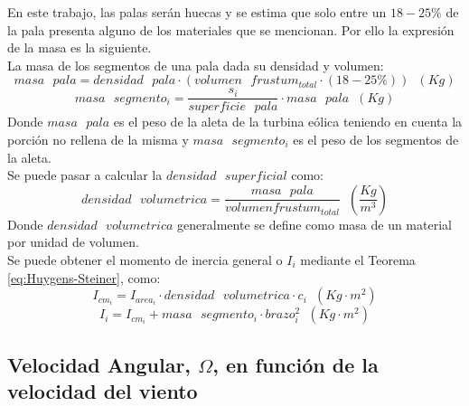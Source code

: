En este trabajo, las palas serán huecas y se estima que solo entre un $18-25\%$ de la pala presenta alguno de los materiales que se mencionan. Por ello la expresión de la masa es la siguiente. \\

La masa de los segmentos de una pala dada su densidad y volumen:
 \begin{equation}
 masa \text{ } pala = densidad \text{ } pala \cdot (volumen \text{ } frustum_{total} \cdot (18-25\%) ) \hspace{7pt} (Kg)
 \end{equation}
 \begin{equation}
 masa \text{ } segmento_i = \dfrac{s_i}{superficie \text{ } pala} \cdot masa \text{ } pala \hspace{7pt} (Kg)
 \label{def:masa_pala} 
 \end{equation}
  Donde $ masa \text{ } pala $ es el peso de la aleta de la turbina eólica teniendo en cuenta la porción no rellena de la misma y $ masa \text{ } segmento_i $ es el peso de los segmentos de la aleta.\\
 
 
Se puede pasar a calcular la $densidad \text{ } superficial$ como:
  \begin{equation}
 densidad \text{ } volumetrica = \dfrac{masa \text{ } pala}{volumen frustum_{total} } \hspace{7pt} \left(\dfrac{Kg}{m^3}\right)
 \label{def:densidad_superficial}
 \end{equation}
 Donde $ densidad \text{ } volumetrica $ generalmente se define como masa de un material por unidad de volumen. \\
 
 
Se puede obtener el momento de inercia general o $I_i$ mediante el Teorema \ref{eq:Huygens-Steiner}, como:
  \begin{equation}
I_{cm_i} = I_{area_i} \cdot densidad \text{ } volumetrica \cdot c_i \hspace{7pt} (Kg \cdot m^2)
 \label{def:momento_inercia_cm}
 \end{equation}
 \begin{equation}
I_i = I_{cm_i} + masa \text{ } segmento_i \cdot brazo_i^2 \hspace{7pt} (Kg \cdot m^2)
 \label{def:momento_inercia_general}
 \end{equation}

 
\subsection{Velocidad Angular, $\Omega$, en función de la velocidad del viento }

